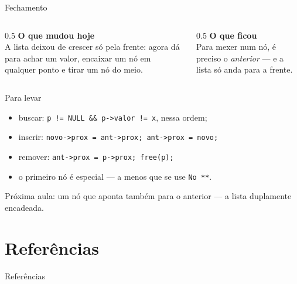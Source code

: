 \documentclass[aspectratio=169]{beamer}
\begin{document}
\begin{frame}{Fechamento}
  \begin{columns}[T]
    \begin{column}{0.5\textwidth}
      \textbf{O que mudou hoje}\\[0.3em]
      \small A lista deixou de crescer só pela frente: agora dá para achar
      um valor, encaixar um nó em qualquer ponto e tirar um nó do meio.
    \end{column}
    \begin{column}{0.5\textwidth}
      \textbf{O que ficou}\\[0.3em]
      \small Para mexer num nó, é preciso o \emph{anterior} --- e a lista só
      anda para a frente.
    \end{column}
  \end{columns}
  \begin{block}{Para levar}
    \begin{itemize}
      \small
      \item buscar: \texttt{p != NULL \&\& p->valor != x}, nessa ordem;
      \item inserir: \texttt{novo->prox = ant->prox; ant->prox = novo;}
      \item remover: \texttt{ant->prox = p->prox; free(p);}
      \item o primeiro nó é especial --- a menos que se use \texttt{No **}.
    \end{itemize}
  \end{block}
  \small\textcolor{UFSGray}{Próxima aula: um nó que aponta também para o
  anterior --- a lista duplamente encadeada.}
\end{frame}

\section*{Referências}
\begin{frame}[allowframebreaks]{Referências}
  \nocite{*}
  
  
\end{frame}
\end{document}
